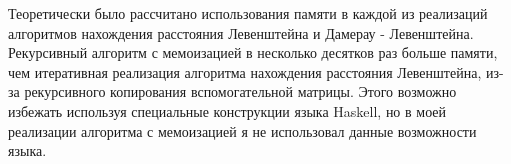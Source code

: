 \documentclass[12pt]{report}
\begin{document}
Теоретически было рассчитано использования памяти в каждой из реализаций алгоритмов нахождения расстояния Левенштейна и Дамерау - Левенштейна. Рекурсивный алгоритм с мемоизацией в несколько десятков раз больше памяти, чем итеративная реализация алгоритма нахождения расстояния Левенштейна, из-за рекурсивного копирования вспомогательной матрицы. Этого возможно избежать используя специальные конструкции языка Haskell, но в моей реализации алгоритма с мемоизацией я не использовал данные возможности языка.



\end{document}
